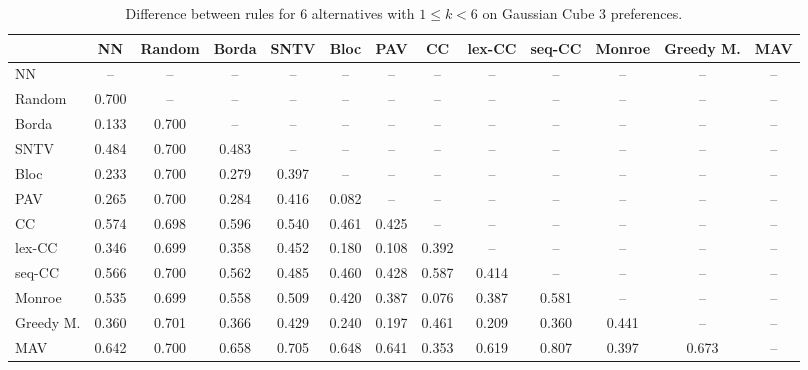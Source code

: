 
\begin{table*}[htbp]
\centering
\begin{tabular}{lcccccccccccc}
\toprule
 & NN & Random & Borda & SNTV & Bloc & PAV & CC & lex-CC & seq-CC & Monroe & Greedy M. & MAV \\
\midrule
NN & -- & -- & -- & -- & -- & -- & -- & -- & -- & -- & -- & -- \\
Random & \cellcolor{blue!70} 0.700 & -- & -- & -- & -- & -- & -- & -- & -- & -- & -- & -- \\
Borda & \cellcolor{blue!13} 0.133 & \cellcolor{blue!70} 0.700 & -- & -- & -- & -- & -- & -- & -- & -- & -- & -- \\
SNTV & \cellcolor{blue!48} 0.484 & \cellcolor{blue!70} 0.700 & \cellcolor{blue!48} 0.483 & -- & -- & -- & -- & -- & -- & -- & -- & -- \\
Bloc & \cellcolor{blue!23} 0.233 & \cellcolor{blue!70} 0.700 & \cellcolor{blue!27} 0.279 & \cellcolor{blue!39} 0.397 & -- & -- & -- & -- & -- & -- & -- & -- \\
PAV & \cellcolor{blue!26} 0.265 & \cellcolor{blue!70} 0.700 & \cellcolor{blue!28} 0.284 & \cellcolor{blue!41} 0.416 & \cellcolor{blue!8} 0.082 & -- & -- & -- & -- & -- & -- & -- \\
CC & \cellcolor{blue!57} 0.574 & \cellcolor{blue!69} 0.698 & \cellcolor{blue!59} 0.596 & \cellcolor{blue!54} 0.540 & \cellcolor{blue!46} 0.461 & \cellcolor{blue!42} 0.425 & -- & -- & -- & -- & -- & -- \\
lex-CC & \cellcolor{blue!34} 0.346 & \cellcolor{blue!69} 0.699 & \cellcolor{blue!35} 0.358 & \cellcolor{blue!45} 0.452 & \cellcolor{blue!18} 0.180 & \cellcolor{blue!10} 0.108 & \cellcolor{blue!39} 0.392 & -- & -- & -- & -- & -- \\
seq-CC & \cellcolor{blue!56} 0.566 & \cellcolor{blue!70} 0.700 & \cellcolor{blue!56} 0.562 & \cellcolor{blue!48} 0.485 & \cellcolor{blue!46} 0.460 & \cellcolor{blue!42} 0.428 & \cellcolor{blue!58} 0.587 & \cellcolor{blue!41} 0.414 & -- & -- & -- & -- \\
Monroe & \cellcolor{blue!53} 0.535 & \cellcolor{blue!69} 0.699 & \cellcolor{blue!55} 0.558 & \cellcolor{blue!50} 0.509 & \cellcolor{blue!42} 0.420 & \cellcolor{blue!38} 0.387 & \cellcolor{blue!7} 0.076 & \cellcolor{blue!38} 0.387 & \cellcolor{blue!58} 0.581 & -- & -- & -- \\
Greedy M. & \cellcolor{blue!36} 0.360 & \cellcolor{blue!70} 0.701 & \cellcolor{blue!36} 0.366 & \cellcolor{blue!42} 0.429 & \cellcolor{blue!24} 0.240 & \cellcolor{blue!19} 0.197 & \cellcolor{blue!46} 0.461 & \cellcolor{blue!20} 0.209 & \cellcolor{blue!36} 0.360 & \cellcolor{blue!44} 0.441 & -- & -- \\
MAV & \cellcolor{blue!64} 0.642 & \cellcolor{blue!70} 0.700 & \cellcolor{blue!65} 0.658 & \cellcolor{blue!70} 0.705 & \cellcolor{blue!64} 0.648 & \cellcolor{blue!64} 0.641 & \cellcolor{blue!35} 0.353 & \cellcolor{blue!61} 0.619 & \cellcolor{blue!80} 0.807 & \cellcolor{blue!39} 0.397 & \cellcolor{blue!67} 0.673 & -- \\
\bottomrule
\end{tabular}

\caption{Difference between rules for 6 alternatives with $1 \leq k < 6$ on Gaussian Cube 3 preferences.}
\label{tab:rule_distance_heatmap-m=[6]-pref_dist=euclidean__args__dimensions=3_-_space=gaussian_cube}
\end{table*}
    